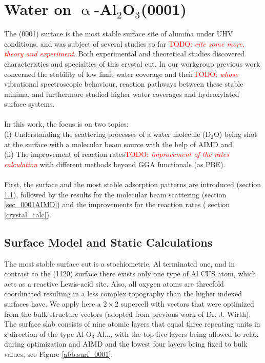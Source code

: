 \documentclass[11pt,DIV=13,BCOR=5mm,a4paper,headinclude]{scrbook}
\newcommand\todo[1]{\textcolor{red}{TODO: \textit{{#1}}}}
\begin{document}
\chapter{Water on $\upalpha$-Al$_2$O$_3$(0001)}
The (0001) surface is the most stable surface site of alumina under UHV conditions, and was subject of several studies so far\cite{kuri10,hass98,hass00,Elam1998} \todo{cite some more, theory and experiment}.
Both experimental and theoretical studies discovered characteristics and specialties of this crystal cut.
In our workgroup previous work concerned the stability of low limit water coverage and their\todo{whose} vibrational spectroscopic behaviour, reaction pathways between these stable minima, and furthermore studied higher water coverages and hydroxylated surface systems\cite{WirthJPCC2012,Wirth2014,Wirth2015}.
\\\\
In this work, the focus is on two topics:
\\
(i) Understanding the scattering processes of a water molecule (D$_2$O) being shot at the surface with a molecular beam source with the help of AIMD and
\\
(ii) The improvement of reaction rates\todo{improvement of the rates calculation} with different methods beyond GGA functionals (as PBE).
\\\\
First, the surface and the most stable adsorption patterns are introduced (section \ref{sec_0001surf}), followed by the results for the molecular beam scattering\cite{Heiden0001_2018} (section \ref{sec_0001AIMD}) and the improvements for the reaction rates ( section \ref{crystal_calc}).
	
\section{Surface Model and Static Calculations}\label{sec_0001surf}
The most stable surface cut is a stochiometric, Al terminated one, and in contrast to the (11\=20) surface there exists only one type of Al CUS atom, which acts as a reactive Lewis-acid site.
Also, all oxygen atoms are threefold coordinated resulting in a less complex topography than the higher indexed surfaces have.
We apply here a $2\times 2$ supercell with vectors that were optimized from the bulk structure vectors (adopted from previous work of Dr. J. Wirth\cite{WirthJPCC2012}).
The surface slab consists of nine atomic layers that equal three repeating units in z direction of the type Al-O$_3$-Al..., with the top five layers being allowed to relax during optimization and AIMD and the lowest four layers being fixed to bulk values, see Figure \ref{abb:surf_0001}.
\end{document}
